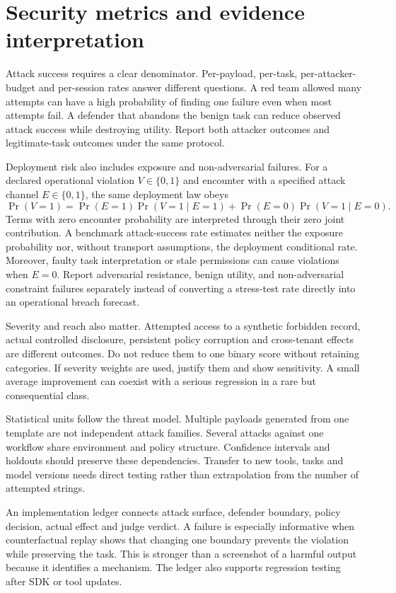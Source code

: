 \section{Security metrics and evidence interpretation}\label{sec:C28:metrics}
Attack success requires a clear denominator. Per-payload, per-task, per-attacker-budget and per-session rates answer different questions. A red team allowed many attempts can have a high probability of finding one failure even when most attempts fail. A defender that abandons the benign task can reduce observed attack success while destroying utility. Report both attacker outcomes and legitimate-task outcomes under the same protocol.

Deployment risk also includes exposure and non-adversarial failures. For a declared operational violation $V\in\{0,1\}$ and encounter with a specified attack channel $E\in\{0,1\}$, the same deployment law obeys
\begin{equation}
 \Pr(V=1)=\Pr(E=1)\Pr(V=1\mid E=1)
 +\Pr(E=0)\Pr(V=1\mid E=0).
\end{equation}
Terms with zero encounter probability are interpreted through their zero joint contribution. A benchmark attack-success rate estimates neither the exposure probability nor, without transport assumptions, the deployment conditional rate. Moreover, faulty task interpretation or stale permissions can cause violations when $E=0$. Report adversarial resistance, benign utility, and non-adversarial constraint failures separately instead of converting a stress-test rate directly into an operational breach forecast.

Severity and reach also matter. Attempted access to a synthetic forbidden record, actual controlled disclosure, persistent policy corruption and cross-tenant effects are different outcomes. Do not reduce them to one binary score without retaining categories. If severity weights are used, justify them and show sensitivity. A small average improvement can coexist with a serious regression in a rare but consequential class.

Statistical units follow the threat model. Multiple payloads generated from one template are not independent attack families. Several attacks against one workflow share environment and policy structure. Confidence intervals and holdouts should preserve these dependencies. Transfer to new tools, tasks and model versions needs direct testing rather than extrapolation from the number of attempted strings.

An implementation ledger connects attack surface, defender boundary, policy decision, actual effect and judge verdict. A failure is especially informative when counterfactual replay shows that changing one boundary prevents the violation while preserving the task. This is stronger than a screenshot of a harmful output because it identifies a mechanism. The ledger also supports regression testing after SDK or tool updates.

